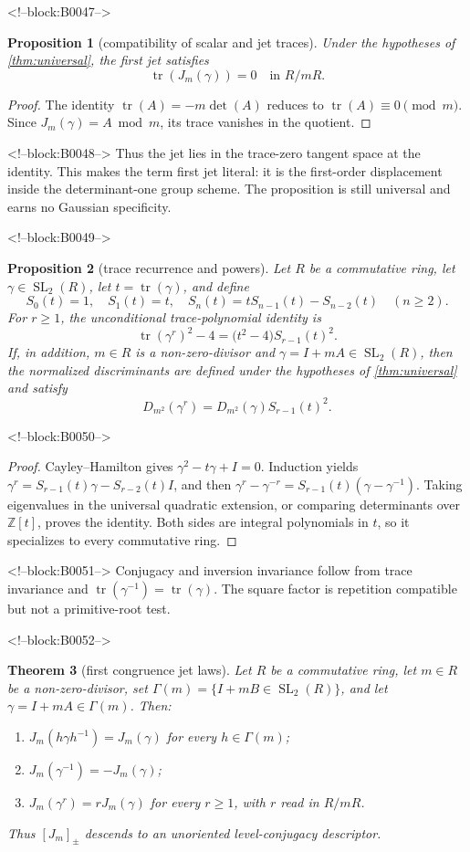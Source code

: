 \documentclass[11pt,a4paper]{article}
\newtheorem{theorem}{Theorem}[section]
\newtheorem{proposition}[theorem]{Proposition}
\theoremstyle{definition}
\theoremstyle{remark}
\newcommand{\SL}{\operatorname{SL}}
\newcommand{\tr}{\operatorname{tr}}
\begin{document}
<!--block:B0047-->
\begin{proposition}[compatibility of scalar and jet traces]\label{prop:jettrace}
Under the hypotheses of \cref{thm:universal}, the first jet satisfies
\[
 \tr(J_m(\gamma))=0\quad\text{in }R/mR.
\]
\end{proposition}
\begin{proof}
The identity \(\tr(A)=-m\det(A)\) reduces to \(\tr(A)\equiv0\pmod m\). Since \(J_m(\gamma)=A\bmod m\), its trace vanishes in the quotient.
\end{proof}

<!--block:B0048-->
Thus the jet lies in the trace-zero tangent space at the identity. This makes the term first jet literal: it is the first-order displacement inside the determinant-one group scheme. The proposition is still universal and earns no Gaussian specificity.

<!--block:B0049-->
\begin{proposition}[trace recurrence and powers]\label{prop:powerdisc}
Let \(R\) be a commutative ring, let \(\gamma\in\SL_2(R)\), let \(t=\tr(\gamma)\), and define
\[
 S_0(t)=1,\quad S_1(t)=t,\quad
 S_n(t)=tS_{n-1}(t)-S_{n-2}(t)\quad(n\ge2).
\]
For \(r\ge1\), the unconditional trace-polynomial identity is
\[
 \tr(\gamma^r)^2-4=\bigl(t^2-4\bigr)S_{r-1}(t)^2.
\]
If, in addition, \(m\in R\) is a non-zero-divisor and \(\gamma=I+mA\in\SL_2(R)\), then the normalized discriminants are defined under the hypotheses of \cref{thm:universal} and satisfy
\[
 D_{m^2}(\gamma^r)=D_{m^2}(\gamma)S_{r-1}(t)^2.
\]
\end{proposition}

<!--block:B0050-->
\begin{proof}
Cayley--Hamilton gives \(\gamma^2-t\gamma+I=0\). Induction yields \(\gamma^r=S_{r-1}(t)\gamma-S_{r-2}(t)I\), and then
\(\gamma^r-\gamma^{-r}=S_{r-1}(t)(\gamma-\gamma^{-1})\).
Taking eigenvalues in the universal quadratic extension, or comparing determinants over \(\mathbb Z[t]\), proves the identity. Both sides are integral polynomials in \(t\), so it specializes to every commutative ring.
\end{proof}

<!--block:B0051-->
Conjugacy and inversion invariance follow from trace invariance and \(\tr(\gamma^{-1})=\tr(\gamma)\). The square factor is repetition compatible but not a primitive-root test.

<!--block:B0052-->
\begin{theorem}[first congruence jet laws]\label{thm:jet}
Let \(R\) be a commutative ring, let \(m\in R\) be a non-zero-divisor,
set \(\Gamma(m)=\{I+mB\in\SL_2(R)\}\), and let
\(\gamma=I+mA\in\Gamma(m)\). Then:
\begin{enumerate}[label=(\alph*)]
 \item \(J_m(h\gamma h^{-1})=J_m(\gamma)\) for every \(h\in\Gamma(m)\);
 \item \(J_m(\gamma^{-1})=-J_m(\gamma)\);
 \item \(J_m(\gamma^r)=rJ_m(\gamma)\) for every \(r\ge1\), with \(r\) read in \(R/mR\).
\end{enumerate}
Thus \([J_m]_{\pm}\) descends to an unoriented level-conjugacy descriptor.
\end{theorem}
\end{document}
